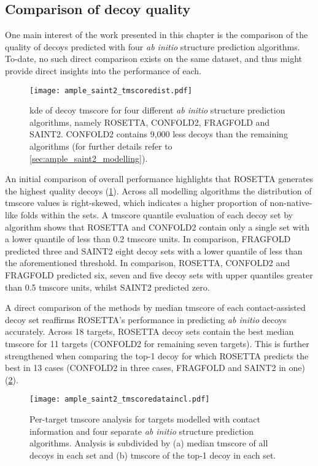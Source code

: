 \subsection{Comparison of decoy quality}
One main interest of the work presented in this chapter is the comparison of the quality of decoys predicted with four \textit{ab initio} structure prediction algorithms. To-date, no such direct comparison exists on the same dataset, and thus might provide direct insights into the performance of each.

\begin{figure}[H]
    \centering
    \texttt{[image: ample\_saint2\_tmscoredist.pdf]}
    \caption[Distribution of decoy TM-scores for four modelling algorithms]{\gls{kde} of decoy \gls{tmscore} for four different \textit{ab initio} structure prediction algorithms, namely ROSETTA, CONFOLD2, FRAGFOLD and SAINT2. CONFOLD2 contains 9,000 less decoys than the remaining algorithms (for further details refer to \cref{sec:ample_saint2_modelling}).}
    \label{fig:ample_saint2_tmscoredist}
\end{figure}

An initial comparison of overall performance highlights that ROSETTA generates the highest quality decoys (\cref{fig:ample_saint2_tmscoredist}). Across all modelling algorithms the distribution of \gls{tmscore} values is right-skewed, which indicates a higher proportion of non-native-like folds within the sets. A \gls{tmscore} quantile evaluation of each decoy set by algorithm shows that ROSETTA and CONFOLD2 contain only a single set with a lower quantile of less than 0.2 \gls{tmscore} units. In comparison, FRAGFOLD predicted three and SAINT2 eight decoy sets with a lower quantile of less than the aforementioned threshold. In comparison, ROSETTA, CONFOLD2 and FRAGFOLD predicted six, seven and five decoy sets with upper quantiles greater than 0.5 \gls{tmscore} units, whilst SAINT2 predicted zero.

A direct comparison of the methods by median \gls{tmscore} of each contact-assisted decoy set reaffirms ROSETTA's performance in predicting \textit{ab initio} decoys accurately. Across 18 targets, ROSETTA decoy sets contain the best median \gls{tmscore} for 11 targets (CONFOLD2 for remaining seven targets). This is further strengthened when comparing the top-1 decoy for which ROSETTA predicts the best in 13 cases (CONFOLD2 in three cases, FRAGFOLD and SAINT2 in one) (\cref{fig:ample_saint2_tmscoredataincl}).

\begin{figure}[H]
    \centering
    \texttt{[image: ample\_saint2\_tmscoredataincl.pdf]}
    \caption[TM-score analysis for four modelling algorithms with contacts]{Per-target \gls{tmscore} analysis for targets modelled with contact information and four separate \textit{ab initio} structure prediction algorithms. Analysis is subdivided by (a) median \gls{tmscore} of all decoys in each set and (b) \gls{tmscore} of the top-1 decoy in each set.}
    \label{fig:ample_saint2_tmscoredataincl}
\end{figure}

